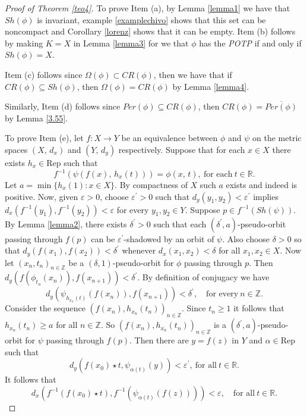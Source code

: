 \documentclass{amsart}
\theoremstyle{definition}
\newcommand{\ep}{\varepsilon}
\begin{document}
\begin{proof}[Proof of Theorem \ref{teo4}]
To prove Item (a), by Lemma \ref{lemma1} we have that $Sh(\phi)$ is invariant, example \ref{examplechivo} shows that this set can be noncompact and Corollary \ref{lorenz} shows that it can be empty.
Item (b) follows by making $K = X$ in Lemma \ref{lemma3} for  we that $\phi$ has the {\em POTP} if and only if $Sh(\phi) = X$. 

Item (c) follows since $\Omega(\phi)\subset CR(\phi)$, then we have that if $CR(\phi)\subseteq Sh(\phi)$, then $\Omega(\phi) =  CR(\phi)$ by Lemma \ref{lemma4}. 

Similarly, Item (d) follows since $Per(\phi)\subseteq CR(\phi)$, then $CR(\phi)=\overline{Per(\phi)}$ by Lemma \ref{3.55}. 

To prove Item (e), let $f\colon X\to Y$ be an equivalence between $\phi$ and $\psi$ on the metric spaces $(X,\,d_x)$ and $(Y,\,d_y)$ respectively. Suppose that for each $x\in X$ there exists $h_x\in \mathrm{Rep}$ such that $$f^{-1}(\psi(f(x),\,h_x(t)))=\phi(x,\,t),\ \mbox{for each}\ t\in \mathbb{R}.$$ Let $a=\min \{ h_x(1): x\in X\}$. By compactness of $X$ such $a$ exists and indeed is positive. Now, given $\ep>0$, choose $\ep^{\prime}>0$ such that $d_y(y_1,y_2)<\ep^{\prime}$ implies $d_x(f^{-1}(y_1),f^{-1}(y_2))<\ep$ for every $y_1,y_2\in Y$. Suppose $p\in f^{-1}(Sh(\psi))$. By Lemma \ref{lemma2}, there exists $\delta^{\prime}>0$ such that each $(\delta^{\prime},a)$-pseudo-orbit passing through $f(p)$ can be $\ep^{\prime}$-shadowed by an orbit of $\psi$. Also choose $\delta>0$ so that $d_y(f(x_1),f(x_2))<\delta^{\prime}$ whenever $d_x(x_1,x_2)<\delta$ for all $x_1,x_2\in X$. Now let $(x_n,t_n)_{n\in\mathbb{Z}}$ be a $(\delta,1)$-pseudo-orbit for $\phi$ passing through $p$. Then $d_y(f(\phi_{t_n}(x_n)),f(x_{n+1}))<\delta^{\prime}$. By definition of conjugacy we have $$d_y(\psi_{h_{x_n}(t)}(f(x_n)),f(x_{n+1}))<\delta^{\prime},\quad \mbox{for every}\ n\in\mathbb{Z}.$$
Consider the sequence $(f(x_n),h_{x_n}(t_n))_{n\in\mathbb{Z}}$. Since $t_n\geq 1$ it follows that $h_{x_n}(t_n)\geq a$ for all $n\in \mathbb{Z}$. So $(f(x_n),h_{x_n}(t_n))_{n\in\mathbb{Z}}$ is a $(\delta^{\prime},a)$-pseudo-orbit for $\psi$ passing through $f(p)$. Then there are $y=f(z)$ in $Y$ and $\alpha \in \mathrm{Rep}$ such that $$d_y(f(x_0)\star t, \psi_{\alpha(t)}(y))<\ep^{\prime},\ \mbox{for all}\ t\in\mathbb{R}.$$
It follows that
\begin{equation}\label{jojo}
d_x\left(f^{-1}(f(x_0)\star t), f^{-1}(\psi_{\alpha(t)}(f(z)))\right)<\ep,\quad \mbox{for all}\ t\in\mathbb{R}.  

\end{equation}
\end{proof}
\end{document}
